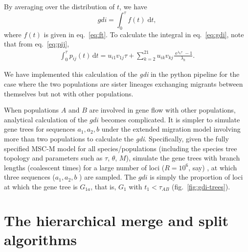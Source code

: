 \documentclass[A4]{article1}
\renewcommand{\d}{\mathrm{d}}
\DeclareMathOperator{\e}{\mathrm{e}}
\begin{document}
By averaging over the distribution of $t$, we have 
\begin{equation} \label{eq:gdi} 
    gdi = \int_0^\tau f(t) \; \d t ,
\end{equation}
where $f(t)$ is given in eq.~\ref{eq:ft}. To calculate the integral in eq.~\ref{eq:gdi},
note that from eq.~\ref{eq:pij},
\begin{equation} 
   \begin{aligned}
      \int_0^\tau p_{ij}(t) \,\d t = 
       u_{i1} v_{1j}\tau %
       + \sum_{k=2}^{21} u_{ik} v_{kj} \frac{\e^{\lambda_k \tau} - 1}{\lambda_k} .
   \end{aligned}
\end{equation}

We have implemented this calculation of the \textit{gdi} in the python pipeline for the
case where the two populations are sister lineages exchanging migrants between
themselves but not with other populations.

When populations $A$ and $B$ are involved in gene flow with other populations,
analytical calculation of the $gdi$ becomes complicated.  It is simpler to simulate gene
trees for sequences $a_1, a_2, b$ under the extended migration model involving more than
two populations to calculate the \textit{gdi}.  Specifically, given the fully specified
MSC-M model for all species/populations (including the species tree topology and
parameters such as $\tau$, $\theta$, $M$), simulate the gene trees with branch lengths
(coalescent times) for a large number of loci ($R = 10^6$, say) , at which three
sequences ($a_1, a_2, b$ ) are sampled.  The $gdi$ is simply the proportion of loci at
which the gene tree is $G_{1a}$, that is, $G_1$ with $t_1 < \tau_{AB}$
(fig.~\ref{fig:gdi-trees}).

\newpage

\section{The hierarchical merge and split algorithms}
\end{document}
